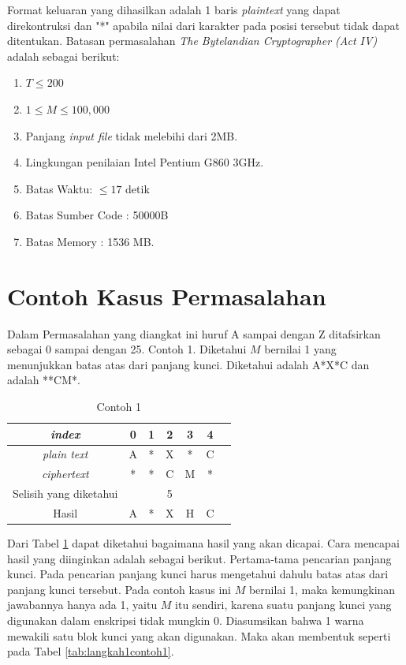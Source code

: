 	
	Format keluaran yang dihasilkan adalah 1 baris \textit{plaintext} yang dapat direkontruksi dan "*" apabila nilai dari karakter pada posisi tersebut tidak dapat ditentukan. 
	Batasan permasalahan \textit{The Bytelandian Cryptographer (Act IV)} adalah sebagai berikut:
	\begin{enumerate}
		\item $T \leq 200$
		\item $1 \leq M \leq 100,000$
		\item Panjang \textit{input file} tidak melebihi dari 2MB.
		\item Lingkungan penilaian Intel Pentium G860 3GHz.
		\item Batas Waktu: $\leq17$ detik
		\item Batas Sumber Code : 50000B
		\item Batas Memory : 1536 MB.                 
	\end{enumerate}

	\section{Contoh Kasus Permasalahan}
	Dalam Permasalahan yang diangkat ini huruf A sampai dengan Z ditafsirkan sebagai 0 sampai dengan 25.
	Contoh 1. Diketahui $M$ bernilai 1 yang menunjukkan batas atas dari panjang kunci. Diketahui \plaintext adalah A*X*C dan \ciphertext adalah **CM*. 
	\begin{table}[H]
	 	\centering
		\caption{Contoh 1}	 	
	 	\begin{tabular}{|c|c|c|c|c|c|c|}\hline
	 	\textit{index}&0&1&2&3&4\\ \hline
	 	\textit{plain text}&A&*&X&*&C\\ \hline
	 	\textit{ciphertext}&*&*&C&M&*\\ \hline
	 	Selisih yang diketahui& & &5& & \\ \hline
	 	Hasil              &A&*&X&H&C\\ \hline
	 	\end{tabular}
	 	\label{tab:contoh1}
	\end{table}
	 
	 Dari Tabel \ref{tab:contoh1} dapat diketahui bagaimana hasil yang akan dicapai. Cara mencapai hasil yang diinginkan adalah sebagai berikut. Pertama-tama pencarian panjang kunci. Pada pencarian panjang kunci harus mengetahui dahulu batas atas dari panjang kunci tersebut. Pada contoh kasus ini $M$ bernilai 1, maka kemungkinan jawabannya hanya ada 1, yaitu $M$ itu sendiri, karena suatu panjang kunci yang digunakan dalam enskripsi tidak mungkin 0. Diasumsikan bahwa 1 warna mewakili satu blok kunci yang akan digunakan. Maka akan membentuk seperti pada Tabel \ref{tab:langkah1contoh1}.
	 
